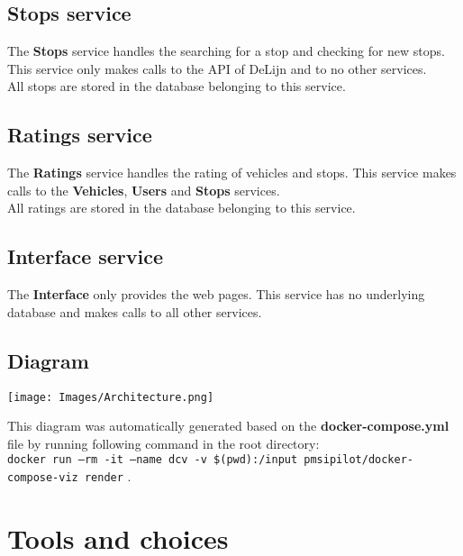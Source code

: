 \documentclass[12pt]{article}
\begin{document}
\subsection{Stops service}
The \textbf{Stops} service handles the searching for a stop and checking for new stops. This service only makes calls to the API of DeLijn and to no other services.\\ 
All stops are stored in the database belonging to this service.

\subsection{Ratings service}
The \textbf{Ratings} service handles the rating of vehicles and stops. This service makes calls to the \textbf{Vehicles}, \textbf{Users} and \textbf{Stops} services.\\
All ratings are stored in the database belonging to this service.

\subsection{Interface service}
The \textbf{Interface} only provides the web pages. This service has no underlying database and makes calls to all other services.

\subsection{Diagram}
\begin{center}
	\texttt{[image: Images/Architecture.png]}
\end{center}
This diagram was automatically generated based on the \textbf{docker-compose.yml} file by running following command in the root directory:\\
\texttt{docker run --rm -it --name dcv -v \$(pwd):/input pmsipilot/docker-compose-viz render} .

\newpage

\section{Tools and choices}
\end{document}
